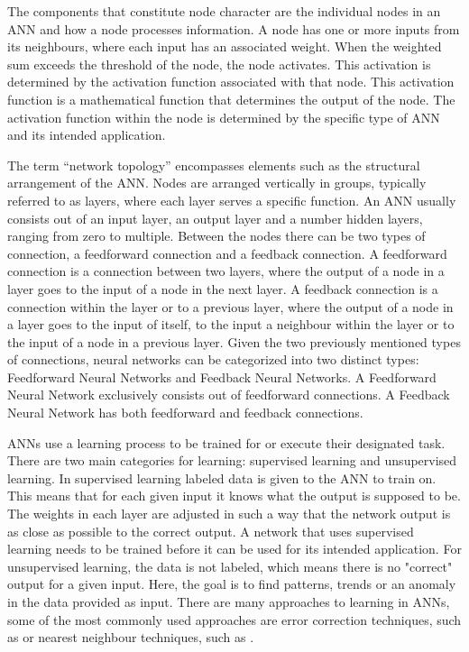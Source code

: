 \documentclass[conference]{IEEEtran}
\begin{document}
The components that constitute node character are the individual nodes in an ANN and how a node processes information. A node has one or more inputs from its neighbours, where each input has an associated weight. When the weighted sum exceeds the threshold of the node, the node activates. This activation is determined by the activation function associated with that node. This activation function is a mathematical function that determines the output of the node. The activation function within the node is determined by the specific type of ANN and its intended application.

The term ``network topology'' encompasses elements such as the structural arrangement of the ANN. Nodes are arranged vertically in groups, typically referred to as layers, where each layer serves a specific function. An ANN usually consists out of an input layer, an output layer and a number hidden layers, ranging from zero to multiple. Between the nodes there can be two types of connection, a feedforward connection and a feedback connection. A feedforward connection is a connection between two layers, where the output of a node in a layer goes to the input of a node in the next layer. A feedback connection is a connection within the layer or to a previous layer, where the output of a node in a layer goes to the input of itself, to the input a neighbour within the layer or to the input of a node in a previous layer. Given the two previously mentioned types of connections, neural networks can be categorized into two distinct types: Feedforward Neural Networks and Feedback Neural Networks. A Feedforward Neural Network exclusively consists out of feedforward connections. A Feedback Neural Network has both feedforward and feedback connections.

ANNs use a learning process to be trained for or execute their designated task. There are two main categories for learning: supervised learning and unsupervised learning. In supervised learning labeled data is given to the ANN to train on. This means that for each given input it knows what the output is supposed to be. The weights in each layer are adjusted in such a way that the network output is as close as possible to the correct output. A network that uses supervised learning needs to be trained before it can be used for its intended application. For unsupervised learning, the data is not labeled, which means there is no "correct" output for a given input. Here, the goal is to find patterns, trends or an anomaly in the data provided as input. There are many approaches to learning in ANNs, some of the most commonly used approaches are error correction techniques, such as \cite{rumelhart1986learning} or nearest neighbour techniques, such as \cite{cover1967nearest}.
\end{document}
